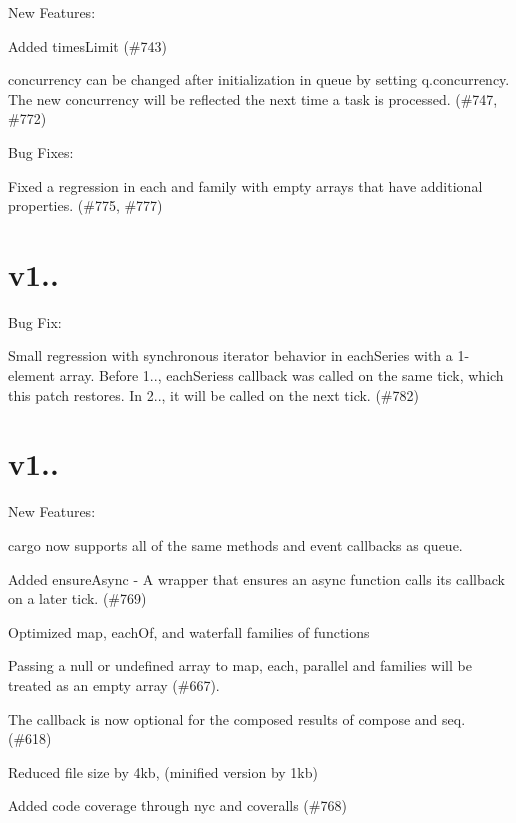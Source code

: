 New Features\+:


\begin{DoxyItemize}
\item Added {\ttfamily times\+Limit} (\#743)
\item {\ttfamily concurrency} can be changed after initialization in {\ttfamily queue} by setting {\ttfamily q.\+concurrency}. The new concurrency will be reflected the next time a task is processed. (\#747, \#772)
\end{DoxyItemize}

Bug Fixes\+:


\begin{DoxyItemize}
\item Fixed a regression in {\ttfamily each} and family with empty arrays that have additional properties. (\#775, \#777)
\end{DoxyItemize}

\section*{v1..}

Bug Fix\+:


\begin{DoxyItemize}
\item Small regression with synchronous iterator behavior in {\ttfamily each\+Series} with a 1-\/element array. Before 1.., {\ttfamily each\+Series}\textquotesingle{}s callback was called on the same tick, which this patch restores. In 2.., it will be called on the next tick. (\#782)
\end{DoxyItemize}

\section*{v1..}

New Features\+:


\begin{DoxyItemize}
\item {\ttfamily cargo} now supports all of the same methods and event callbacks as {\ttfamily queue}.
\item Added {\ttfamily ensure\+Async} -\/ A wrapper that ensures an async function calls its callback on a later tick. (\#769)
\item Optimized {\ttfamily map}, {\ttfamily each\+Of}, and {\ttfamily waterfall} families of functions
\item Passing a {\ttfamily null} or {\ttfamily undefined} array to {\ttfamily map}, {\ttfamily each}, {\ttfamily parallel} and families will be treated as an empty array (\#667).
\item The callback is now optional for the composed results of {\ttfamily compose} and {\ttfamily seq}. (\#618)
\item Reduced file size by 4kb, (minified version by 1kb)
\item Added code coverage through {\ttfamily nyc} and {\ttfamily coveralls} (\#768)
\end{DoxyItemize}

